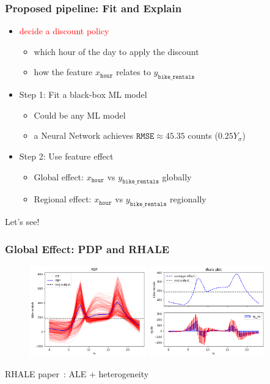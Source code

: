 \documentclass{beamer}
\newcommand{\red}[1]{\textcolor{red}{#1}}
\begin{document}
\begin{frame}
  \frametitle{Proposed pipeline: Fit and Explain}
  \begin{itemize}
  \item \red{decide a discount policy}
    \begin{itemize}
    \item which hour of the day to apply the discount
    \item how the feature $x_{\mathtt{hour}}$ relates to $y_{\mathtt{bike\_rentals}}$
    \end{itemize}

  \item Step 1: Fit a black-box ML model
    \begin{itemize}
    \item Could be any ML model
    \item a Neural Network achieves $\texttt{RMSE} \approx 45.35 $ counts ($0.25Y_\sigma$)
    \end{itemize}
  \item Step 2: Use feature effect
    \begin{itemize}
    \item Global effect: $x_{\mathtt{hour}}$ vs $y_{\mathtt{bike\_rentals}}$ globally
    \item Regional effect: $x_{\mathtt{hour}}$ vs $y_{\mathtt{bike\_rentals}}$ regionally
    \end{itemize}
  \end{itemize}

  \noindent\makebox[\linewidth]{\rule{\paperwidth}{0.4pt}}
  Let's see!
\end{frame}

\begin{frame}
  \frametitle{Global Effect: PDP and RHALE}
  \begin{figure}[ht]
    \centering
    \includegraphics[width=0.45\textwidth]{./figures/bike_sharing_global_pdp_heterogeneity.png}
    \includegraphics[width=0.45\textwidth]{./figures/bike_sharing_global_rhale_heterogeneity.png}
  \end{figure}
  \noindent\makebox[\linewidth]{\rule{\paperwidth}{0.4pt}}
  RHALE paper~\citep{gkolemis2023rhale}: ALE + heterogeneity
\end{frame}
\end{document}
